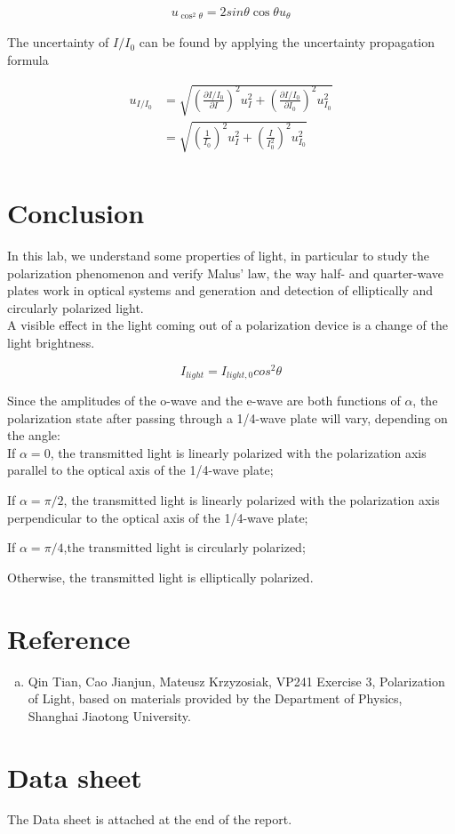 \documentclass{article}
\begin{document}
\begin{align*}
u_{\cos^2\theta}=2sin\theta\cos\theta u_{\theta}
\end{align*}

The uncertainty of $I/I_0$ can be found by applying the uncertainty propagation formula

\begin{align*}
u_{I/I_0}&=\sqrt{\left(\frac{\partial I/I_0}{\partial I}\right)^2u_{I}^2+\left(\frac{\partial I/I_0}{\partial I_0}\right)^2u_{I_0}^2}\\
&=\sqrt{\left(\frac{1}{I_0}\right)^2u_{I}^2+\left(\frac{I}{I_0^2}\right)^2u_{I_0}^2}\\
\end{align*}


\section{Conclusion}

In this lab, we understand some properties of light, in particular to study the polarization phenomenon and verify Malus' law, the way half- and quarter-wave plates work in optical systems and generation and detection of elliptically and circularly polarized light.\\

A visible effect in the light coming out of a polarization device is a change of the light brightness.

$$I_{light}=I_{light,0}cos^2\theta$$

Since the amplitudes of the o-wave and the e-wave are both functions of $ \alpha $, the polarization state after passing through a 1/4-wave plate will vary, depending on the angle:\\

If $ \alpha= 0 $, the transmitted light is linearly polarized with the polarization axis parallel to the optical axis of the 1/4-wave plate;

If $ \alpha=\pi/2 $, the transmitted light is linearly polarized with the polarization axis perpendicular to the optical axis of the 1/4-wave plate;

If $ \alpha=\pi/4 $,the transmitted light is circularly polarized;

Otherwise, the transmitted light is elliptically polarized.


\section{Reference}

\begin{enumerate}[(a)]
	\item
	Qin Tian, Cao Jianjun, Mateusz Krzyzosiak, VP241 Exercise 3, Polarization of Light, based on materials provided by the Department of Physics, Shanghai Jiaotong University.
\end{enumerate}

\section{Data sheet}

The Data sheet is attached at the end of the report.
\end{document}
